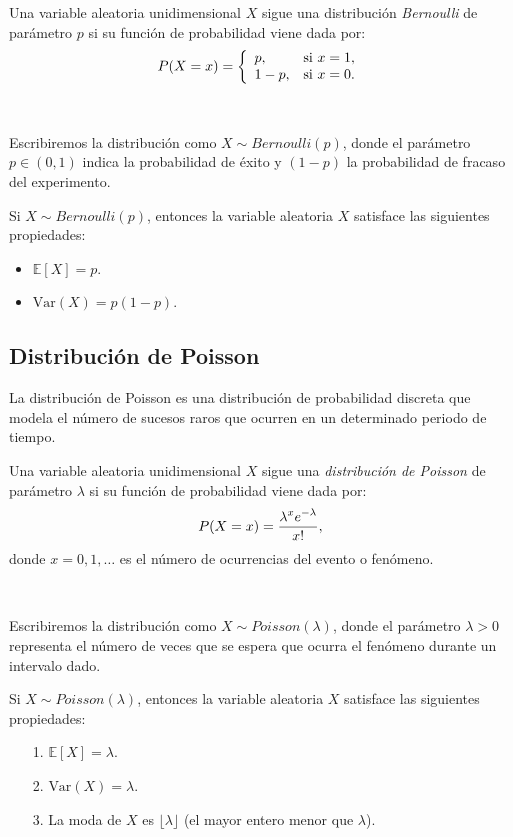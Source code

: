 \documentclass[oneside,openright,titlepage,numbers=noenddot,openany,headinclude,footinclude=true,
cleardoublepage=empty,abstractoff,BCOR=5mm,paper=a4,fontsize=12pt,main=spanish]{scrreprt}
\begin{document}
\begin{definition}
Una variable aleatoria unidimensional $X$ sigue una distribución \textit{Bernoulli} de parámetro $p$ si su función de probabilidad viene dada por: $$P(X=x)=\left \{
\begin{array}{l l}
p, & \mbox{si } x = 1, \\
1-p, & \mbox{si } x =0.
\end{array}
\right.$$
\end{definition}\

Escribiremos la distribución como $X \sim Bernoulli(p)$, donde el parámetro $p\in (0,1)$ indica la probabilidad de éxito y $(1-p)$ la probabilidad de fracaso del experimento.\\

\begin{proposition}[Propiedades]
Si $X \sim Bernoulli(p)$, entonces la variable aleatoria $X$ satisface las siguientes propiedades:
\begin{itemize}
    \item $\mathbb{E}[X]=p$.
    \item $\text{Var}(X)=p(1-p)$.
\end{itemize}
\end{proposition}

\clearpage

\subsection{Distribución de Poisson}

La distribución de Poisson es una distribución de probabilidad discreta que modela el número de sucesos raros que ocurren en un determinado periodo de tiempo.\\

\begin{definition}
Una variable aleatoria unidimensional $X$ sigue una \textit{distribución de Poisson} de parámetro $\lambda$ si su función de probabilidad viene dada por: $$P(X=x)=\frac{\displaystyle \lambda^xe^{-\lambda}}{\displaystyle x!},$$
donde $x=0,1,\dots$ es el número de ocurrencias del evento o fenómeno.
\end{definition}\

Escribiremos la distribución como $X \sim Poisson(\lambda)$, donde el parámetro $\lambda > 0$ representa el número de veces que se espera que ocurra el fenómeno durante un intervalo dado.\\


\begin{proposition}
Si $X \sim Poisson(\lambda)$, entonces la variable aleatoria $X$ satisface las siguientes propiedades:
\begin{itemize}
    \item[1.] $\mathbb{E}[X]=\lambda$.
    \item[2.] $\text{Var}(X)=\lambda$.
    \item[3.] La moda de $X$ es $\lfloor \lambda \rfloor$ (el mayor entero menor que $\lambda$).
\end{itemize}
\end{proposition}
\end{document}
